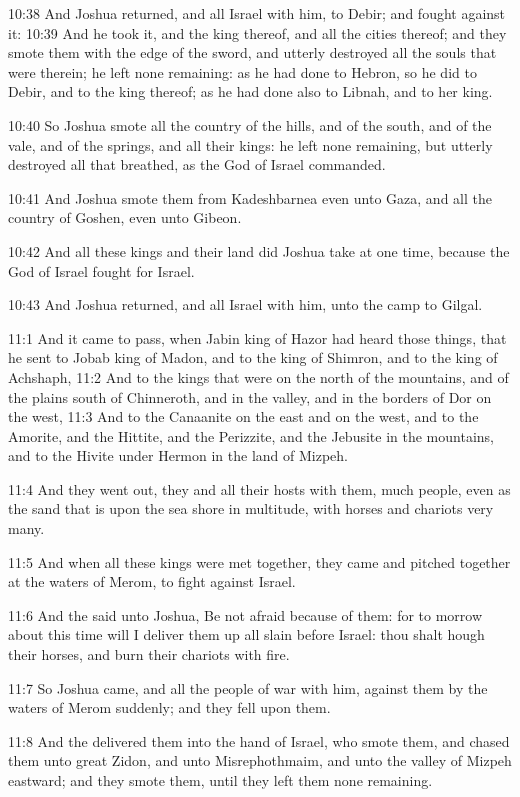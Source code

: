 10:38 And Joshua returned, and all Israel with him, to Debir; and
fought against it: 10:39 And he took it, and the king thereof, and all
the cities thereof; and they smote them with the edge of the sword,
and utterly destroyed all the souls that were therein; he left none
remaining: as he had done to Hebron, so he did to Debir, and to the
king thereof; as he had done also to Libnah, and to her king.

10:40 So Joshua smote all the country of the hills, and of the south,
and of the vale, and of the springs, and all their kings: he left none
remaining, but utterly destroyed all that breathed, as the \LORD God of
Israel commanded.

10:41 And Joshua smote them from Kadeshbarnea even unto Gaza, and all
the country of Goshen, even unto Gibeon.

10:42 And all these kings and their land did Joshua take at one time,
because the \LORD God of Israel fought for Israel.

10:43 And Joshua returned, and all Israel with him, unto the camp to
Gilgal.

11:1 And it came to pass, when Jabin king of Hazor had heard those
things, that he sent to Jobab king of Madon, and to the king of
Shimron, and to the king of Achshaph, 11:2 And to the kings that were
on the north of the mountains, and of the plains south of Chinneroth,
and in the valley, and in the borders of Dor on the west, 11:3 And to
the Canaanite on the east and on the west, and to the Amorite, and the
Hittite, and the Perizzite, and the Jebusite in the mountains, and to
the Hivite under Hermon in the land of Mizpeh.

11:4 And they went out, they and all their hosts with them, much
people, even as the sand that is upon the sea shore in multitude, with
horses and chariots very many.

11:5 And when all these kings were met together, they came and pitched
together at the waters of Merom, to fight against Israel.

11:6 And the \LORD said unto Joshua, Be not afraid because of them: for
to morrow about this time will I deliver them up all slain before
Israel: thou shalt hough their horses, and burn their chariots with
fire.

11:7 So Joshua came, and all the people of war with him, against them
by the waters of Merom suddenly; and they fell upon them.

11:8 And the \LORD delivered them into the hand of Israel, who smote
them, and chased them unto great Zidon, and unto Misrephothmaim, and
unto the valley of Mizpeh eastward; and they smote them, until they
left them none remaining.

